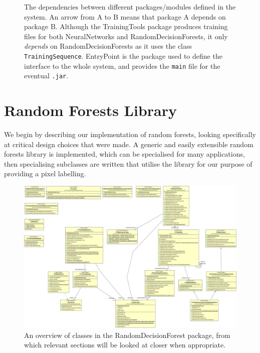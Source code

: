\documentclass[12pt,twoside,notitlepage]{report}
\begin{document}
\begin{figure}[H]
        \caption[The dependencies between different packages/modules defined in the system.]{The dependencies between different packages/modules defined in the system. An arrow from A to B means that package A depends on package B. 
        Although the TrainingTools package produces training files for both NeuralNetworks and RandomDecisionForests, it only
        \textit{depends} on RandomDecisionForests as it uses the class \texttt{TrainingSequence}. EntryPoint is the package used to define the interface to the whole system, and provides the \texttt{main} file for the eventual \texttt{.jar}.}
        \label{fig:package_dependencies}
    \end{figure}




    \section{Random Forests Library}
        We begin by describing our implementation of random forests, looking specifically at critical design 
        choices that were made. A generic and easily extensible random forests library is implemented, which can 
        be specialised for many applications, then specialising subclasses are written that utilise the library for our 
        purpose of providing a pixel labelling.

        \begin{figure}[H]
            \centering
            \includegraphics[scale=0.25, angle=90]{Forest_UML}
            \caption[An overview of classes in the RandomDecisionForest package]{An overview of classes in the RandomDecisionForest package, from which relevant sections will be 
            looked at closer when appropriate.}
            \label{fig:forest_uml}
        \end{figure}
\end{document}
